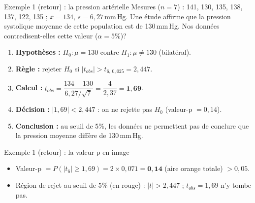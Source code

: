 \documentclass{BeamerTemplate}
\def\dtsix{0.38273*(1+x^2/6)^(-3.5)}
\begin{document}
\begin{frame}[t]{Exemple 1 (retour) : la pression artérielle}
  Mesures ($n = 7$) : 141, 130, 135, 138, 137, 122, 135 ; $\bar{x} = 134$, $s = 6{,}27$\,mm\,Hg.
  Une étude affirme que la pression systolique moyenne de cette population est de 130\,mm\,Hg. Nos données contredisent-elles cette valeur ($\alpha = 5\%$)?

  \medskip
  \begin{enumerate}\itemsep 1.5mm
    \item<2-> \textbf{Hypothèses :} $H_0 : \mu = 130$ contre $H_1 : \mu \ne 130$ (bilatéral).
    \item<3-> \textbf{Règle :} rejeter $H_0$ si $|t_{obs}| > t_{6,\,0{,}025} = 2{,}447$.
    \item<4-> \textbf{Calcul :} $t_{obs} = \dfrac{134 - 130}{6{,}27/\sqrt{7}} = \dfrac{4}{2{,}37} = \mathbf{1{,}69}$.
    \item<5-> \textbf{Décision :} $|1{,}69| < 2{,}447$ : on \alert{ne rejette pas} $H_0$ (valeur-p $= 0{,}14$).
    \item<6-> \textbf{Conclusion :} au seuil de 5\%, les données ne permettent pas de conclure que la pression moyenne diffère de 130\,mm\,Hg.
  \end{enumerate}
\end{frame}

\begin{frame}[t]{Exemple 1 (retour) : la valeur-p en image}
  \centering

  \raggedright
  \small
  \begin{itemize}\itemsep 1mm
    \item Valeur-p $= P(|t_6| \ge 1{,}69) = 2 \times 0{,}071 = \mathbf{0{,}14}$ (aire orange totale) $> 0{,}05$.
    \item Région de rejet au seuil de 5\% (en rouge) : $|t| > 2{,}447$ ; $t_{obs} = 1{,}69$ n'y tombe pas.
  \end{itemize}
\end{frame}
\end{document}
